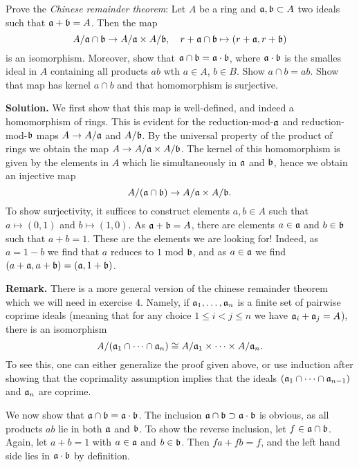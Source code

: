 \documentclass[a4paper,11pt]{article}
\begin{document}
Prove the \textit{Chinese remainder theorem}: Let $A$ be a ring and $\mathfrak{a}, \mathfrak{b}
\subset A$ two ideals such that $\mathfrak{a} + \mathfrak{b} = A$. Then the map 
\begin{equation*}
    A/ \mathfrak{a} \cap \mathfrak{b} \to A/ \mathfrak{a} \times A/\mathfrak{b}, \quad 
    r + \mathfrak{a} \cap \mathfrak{b} \mapsto (r + \mathfrak{a}, r + \mathfrak{b})
\end{equation*}
is an isomorphism. Moreover, show that $\mathfrak{a} \cap \mathfrak{b} = \mathfrak{a} \cdot \mathfrak{b}$, where
$\mathfrak{a} \cdot \mathfrak{b}$ is the smalles ideal in $A$ containing all products $ab$ 
wth $a \in A$, $b \in B$. 
Show $a \cap b = ab$. Show that map has kernel $a \cap b$ and that homomorphism is surjective. 

\textbf{Solution.} We first show that this map is well-defined, and indeed a 
homomorphism of rings. This is evident for the reduction-mod-$\mathfrak{a}$ and 
reduction-mod-$\mathfrak{b}$ maps $A \to A/\mathfrak{a}$ and $A/\mathfrak{b}$. By the universal property of 
the product of rings we obtain the map $A \to A/\mathfrak{a} \times A/\mathfrak{b}$. The kernel
of this homomorphism is given by the elements in $A$ which lie simultaneously in 
$\mathfrak{a}$ and $\mathfrak{b}$, hence we obtain an injective map 
\begin{equation*}
    A/(\mathfrak{a} \cap \mathfrak{b}) \to A/\mathfrak{a} \times A/\mathfrak{b}.
\end{equation*}
To show surjectivity, it suffices to construct elements $a, b \in A$ such that 
$a \mapsto (0,1)$ and $b \mapsto (1,0)$. As $\mathfrak{a} + \mathfrak{b} = A$, there are elements
$a \in \mathfrak{a}$ and $b \in \mathfrak{b}$ such that $a + b = 1$. These are the elements we 
are looking for! Indeed, as $a = 1 - b$ we find that $a$ reduces to $1$ mod $\mathfrak{b}$,
and as $a \in \mathfrak{a}$ we find $(a + \mathfrak{a}, a + \mathfrak{b}) = (\mathfrak{a}, 1 + \mathfrak{b})$. 

\textbf{Remark.} There is a more general version of the chinese remainder theorem
which we will need in exercise 4. Namely, if $\mathfrak{a}_1, \dots, \mathfrak{a}_n$ is a finite
set of pairwise coprime ideals (meaning that for any choice $1 \leq i < j \leq n$
we have $\mathfrak{a}_i + \mathfrak{a}_j = A$), there is an isomorphism
\begin{equation*}
    A/(\mathfrak{a}_1 \cap \dots \cap \mathfrak{a}_n) \cong A/\mathfrak{a}_1 \times \dots \times A/\mathfrak{a}_n.
\end{equation*}
To see this, one can either generalize the proof given above, or use induction
after showing that the coprimality assumption implies that the ideals
$(\mathfrak{a}_1 \cap \dots \cap \mathfrak{a}_{n-1})$ and $\mathfrak{a}_n$ are coprime.

We now show that $\mathfrak{a} \cap \mathfrak{b} = \mathfrak{a} \cdot \mathfrak{b}$. The inclusion 
$\mathfrak{a} \cap \mathfrak{b} \supset \mathfrak{a} \cdot \mathfrak{b}$ is obvious, as all products $ab$ lie in both
$\mathfrak{a}$ and $\mathfrak{b}$. To show the reverse inclusion, let $f \in \mathfrak{a} \cap \mathfrak{b}$. Again,
let $a + b = 1$ with $a \in \mathfrak{a}$ and $b \in \mathfrak{b}$. Then $fa + fb = f$, and the 
left hand side lies in $\mathfrak{a} \cdot \mathfrak{b}$ by definition. 
\end{document}
